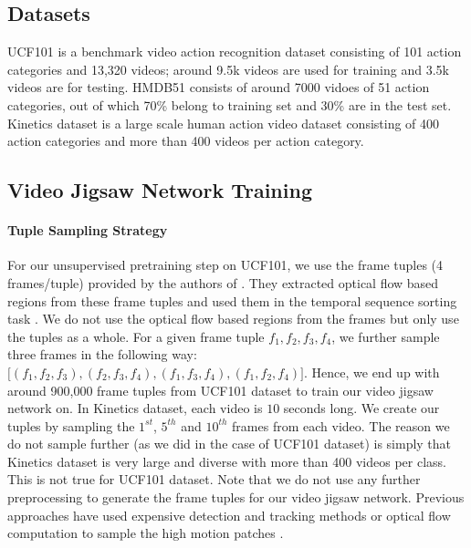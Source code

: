 \documentclass[10pt,twocolumn,letterpaper]{article}
\begin{document}
\subsection{Datasets}
UCF101 \cite{soomro2012ucf101} is a benchmark video action recognition dataset consisting of 101 action categories and 13,320 videos; around 9.5k videos are used for training and 3.5k videos are for testing. HMDB51 \cite{kuehne2011hmdb} consists of around 7000 vidoes of 51 action categories, out of which 70\% belong to training set and 30\% are in the test set. Kinetics dataset \cite{kay2017kinetics} is a large scale human action video dataset consisting of 400 action categories and more than 400 videos per action category. 

\subsection{Video Jigsaw Network Training}
\paragraph{\textbf{Tuple Sampling Strategy}}
For our unsupervised pretraining step on UCF101, we use the frame tuples (4 frames/tuple) provided by the authors of \cite{lee2017unsupervised}. They extracted optical flow based regions from these frame tuples and used them in the temporal sequence sorting task \cite{lee2017unsupervised}. We do not use the optical flow based regions from the frames but only use the tuples as a whole. For a given frame tuple $f_1, f_2, f_3, f_4$, we further sample three frames in the following way: \\ $\lbrack (f_1,f_2,f_3), (f_2,f_3,f_4), (f_1,f_3,f_4), (f_1,f_2,f_4) \rbrack$. Hence, we end up with around 900,000 frame tuples from UCF101 dataset to train our video jigsaw network on. In Kinetics dataset, each video is $10$ seconds long. We create our tuples by sampling the $1^{st}$, $5^{th}$ and $10^{th}$ frames from each video. The reason we do not sample further (as we did in the case of UCF101 dataset) is simply that Kinetics dataset is very large and diverse with more than 400 videos per class. This is not true for UCF101 dataset. Note that we do not use any further preprocessing to generate the frame tuples for our video jigsaw network. Previous approaches have used expensive detection and tracking methods \cite{wang2015unsupervised} or optical flow computation to sample the high motion patches \cite{lee2017unsupervised}. 
\vspace{-3mm}
\end{document}
